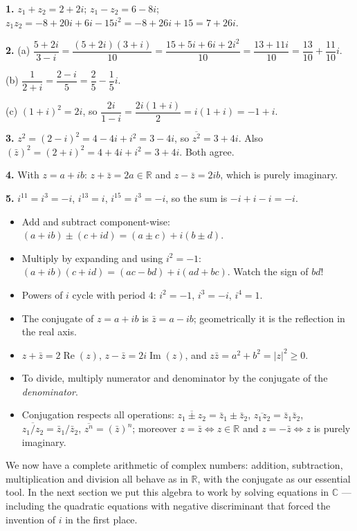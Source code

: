 \documentclass[11pt]{article}
\begin{document}
\begin{corrige}[Exercise 1]
\textbf{1.} $z_{1}+z_{2}=2+2i$; $z_{1}-z_{2}=6-8i$; $z_{1}z_{2}=-8+20i+6i-15i^{2}=-8+26i+15=7+26i$.

\textbf{2.} (a) $\dfrac{5+2i}{3-i}=\dfrac{(5+2i)(3+i)}{10}=\dfrac{15+5i+6i+2i^{2}}{10}=\dfrac{13+11i}{10}=\dfrac{13}{10}+\dfrac{11}{10}i$.

(b) $\dfrac{1}{2+i}=\dfrac{2-i}{5}=\dfrac{2}{5}-\dfrac{1}{5}i$.

(c) $(1+i)^{2}=2i$, so $\dfrac{2i}{1-i}=\dfrac{2i(1+i)}{2}=i(1+i)=-1+i$.

\textbf{3.} $z^{2}=(2-i)^{2}=4-4i+i^{2}=3-4i$, so $\overline{z^{2}}=3+4i$. Also $(\bar{z})^{2}=(2+i)^{2}=4+4i+i^{2}=3+4i$. Both agree.

\textbf{4.} With $z=a+ib$: $z+\bar{z}=2a\in\mathbb{R}$ and $z-\bar{z}=2ib$, which is purely imaginary.

\textbf{5.} $i^{11}=i^{3}=-i$, $i^{13}=i$, $i^{15}=i^{3}=-i$, so the sum is $-i+i-i=-i$.
\end{corrige}

\begin{aretenir}
\begin{itemize}
\item Add and subtract component-wise: $(a+ib)\pm(c+id)=(a\pm c)+i(b\pm d)$.
\item Multiply by expanding and using $i^{2}=-1$: $(a+ib)(c+id)=(ac-bd)+i(ad+bc)$. Watch the sign of $bd$!
\item Powers of $i$ cycle with period $4$: $i^{2}=-1$, $i^{3}=-i$, $i^{4}=1$.
\item The conjugate of $z=a+ib$ is $\bar{z}=a-ib$; geometrically it is the reflection in the real axis.
\item $z+\bar{z}=2\operatorname{Re}(z)$, $z-\bar{z}=2i\operatorname{Im}(z)$, and $z\bar{z}=a^{2}+b^{2}=|z|^{2}\geq 0$.
\item To divide, multiply numerator and denominator by the conjugate of the \emph{denominator}.
\item Conjugation respects all operations: $\overline{z_{1}\pm z_{2}}=\bar{z}_{1}\pm\bar{z}_{2}$, $\overline{z_{1}z_{2}}=\bar{z}_{1}\bar{z}_{2}$, $\overline{z_{1}/z_{2}}=\bar{z}_{1}/\bar{z}_{2}$, $\overline{z^{n}}=(\bar{z})^{n}$; moreover $z=\bar{z}\iff z\in\mathbb{R}$ and $z=-\bar{z}\iff z$ is purely imaginary.
\end{itemize}
\end{aretenir}

We now have a complete arithmetic of complex numbers: addition, subtraction, multiplication and division all behave as in $\mathbb{R}$, with the conjugate as our essential tool. In the next section we put this algebra to work by solving equations in $\mathbb{C}$ — including the quadratic equations with negative discriminant that forced the invention of $i$ in the first place.
\end{document}
